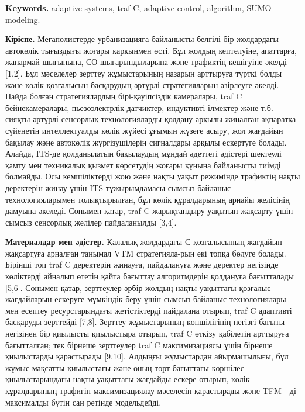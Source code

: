 {\bfseries Keywords.} adaptive systems, traf C, adaptive control,
algorithm, SUMO modeling.
\begin{multicols}{2}

{\bfseries Кіріспе.} Мегаполистерде урбанизацияға байланысты белгілі бір
жолдардағы автокөлік тығыздығы жоғары қарқынмен өсті. Бұл жолдың
кептелуіне, апаттарға, жанармай шығынына, СО шығарындыларына және
трафиктің кешігуіне әкелді {[}1,2{]}. Бұл мәселелер зерттеу жұмыстарының
назарын арттыруға түрткі болды және көлік қозғалысын басқарудың әртүрлі
стратегияларын әзірлеуге әкелді. Пайда болған стратегиялардың
бірі-қауіпсіздік камералары, traf C бейнекамералары, пьезоэлектрлік
датчиктер, индуктивті ілмектер және т.б. сияқты әртүрлі сенсорлық
технологияларды қолдану арқылы жиналған ақпаратқа сүйенетін
интеллектуалды көлік жүйесі ұғымын жүзеге асыру, жол жағдайын бақылау
және автокөлік жүргізушілерін сигналдары арқылы ескертуге болады.
Алайда, ITS-де қолданылатын бақылаудың мұндай әдеттегі әдістері шектеулі
қамту мен техникалық қызмет көрсетудің жоғары құнына байланысты тиімді
болмайды. Осы кемшіліктерді жою және нақты уақыт режимінде трафиктің
нақты деректерін жинау үшін ITS тұжырымдамасы сымсыз байланыс
технологияларымен толықтырылған, бұл көлік құралдарының арнайы желісінің
дамуына әкеледі. Сонымен қатар, traf C жарықтандыру уақытын жақсарту
үшін сымсыз сенсорлық желілер пайдаланылды {[}3,4{]}.

{\bfseries Материалдар мен әдістер.} Қалалық жолдардағы С қозғалысының
жағдайын жақсартуға арналған танымал VTM стратегияла-рын екі топқа бөлуге
болады. Бірінші топ traf C деректерін жинауға, пайдалануға және деректер
негізінде көліктерді айналып өтетін қайта бағыттау алгоритмдерін
қолдануға бағытталады {[}5,6{]}. Сонымен қатар, зерттеулер әрбір жолдың
нақты уақыттағы қозғалыс жағдайларын ескеруге мүмкіндік беру үшін сымсыз
байланыс технологиялары мен есептеу ресурстарындағы жетістіктерді
пайдалана отырып, traf C адаптивті басқаруды зерттейді {[}7,8{]}.
Зерттеу жұмыстарының көпшілігінің негізгі бағыты негізінен бір қиылысты
қиылыстыра отырып, traf C өткізу қабілетін арттыруға бағытталған; тек
бірнеше зерттеулер traf C максимизациясы үшін бірнеше қиылыстарды
қарастырады {[}9,10{]}. Алдыңғы жұмыстардан айырмашылығы, бұл жұмыс
мақсатты қиылыстағы және оның төрт бағыттағы көршілес қиылыстарындағы
нақты уақыттағы жағдайды ескере отырып, көлік құралдарының трафигін
максимизациялау мәселесін қарастырады және TFM - ді максималды бүтін сан
ретінде модельдейді.


\end{multicols}
